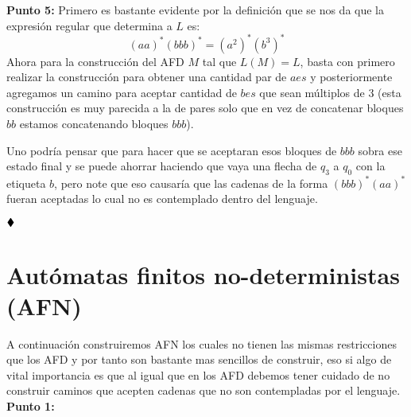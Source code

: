 \textbf{Punto 5:} Primero es bastante evidente por la definición que se nos da que la expresión regular que determina a $L$ es:
$$(aa)^*(bbb)^*=\left(a^2\right)^*\left(b^3\right)^*$$
Ahora para la construcción del AFD $M$ tal que $L(M)=L$, basta con primero realizar la construcción para obtener una cantidad par de $aes$ y posteriormente agregamos un camino para aceptar cantidad de $bes$ que sean múltiplos de $3$ (esta construcción es muy parecida a la de pares solo que en vez de concatenar bloques $bb$ estamos concatenando bloques $bbb$).
    \begin{basedtikz}
    \end{basedtikz}
    Uno podría pensar que para hacer que se aceptaran esos bloques de $bbb$ sobra ese estado final y se puede ahorrar haciendo que vaya una flecha de $q_3$ a $q_0$ con la etiqueta $b$, pero note que eso causaría que las cadenas de la forma $(bbb)^*(aa)^*$ fueran aceptadas lo cual no es contemplado dentro del lenguaje.
    
    $\hfill \blacklozenge$

    \section{Autómatas finitos no-deterministas (AFN)} 

  A continuación construiremos AFN los cuales no tienen las mismas restricciones que los AFD y por tanto son bastante mas sencillos de construir, eso si algo de vital importancia es que al igual que en los AFD debemos tener cuidado de no construir caminos que acepten cadenas que no son contempladas por el lenguaje.\\

  \textbf{Punto 1:}


